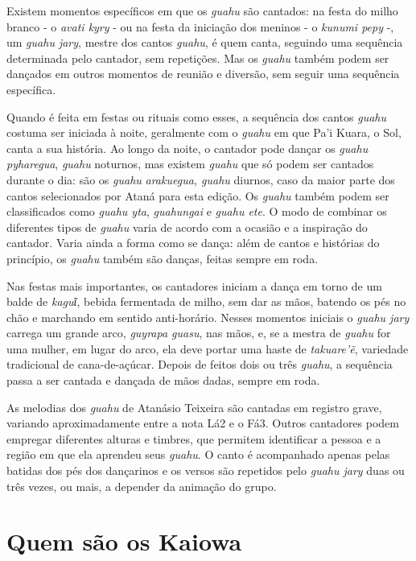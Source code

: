 Existem momentos específicos em que os \emph{guahu} são cantados: na
festa do milho branco - o \emph{avati kyry} - ou na festa da iniciação
dos meninos - o \emph{kunumi pepy} -, um \emph{guahu jary}, mestre dos
cantos \emph{guahu}, é quem canta, seguindo uma sequência determinada
pelo cantador, sem repetições. Mas os \emph{guahu} também podem ser
dançados em outros momentos de reunião e diversão, sem seguir uma
sequência específica.

Quando é feita em festas ou rituais como esses, a sequência dos cantos
\emph{guahu} costuma ser iniciada à noite, geralmente com o \emph{guahu}
em que Pa'i Kuara, o Sol, canta a sua história. Ao longo da noite, o
cantador pode dançar os \emph{guahu pyharegua}, \emph{guahu} noturnos,
mas existem \emph{guahu} que só podem ser cantados durante o dia: são os
\emph{guahu} \emph{arakuegua, guahu} diurnos, caso da maior parte dos
cantos selecionados por Ataná para esta edição. Os \emph{guahu} também
podem ser classificados como \emph{guahu yta}, \emph{guahungai} e
\emph{guahu ete}. O modo de combinar os diferentes tipos de \emph{guahu}
varia de acordo com a ocasião e a inspiração do cantador. Varia ainda a
forma como se dança: além de cantos e histórias do princípio, os
\emph{guahu} também são danças, feitas sempre em roda.

Nas festas mais importantes, os cantadores iniciam a dança em torno de
um balde de \emph{kaguῖ}, bebida fermentada de milho, sem dar as mãos,
batendo os pés no chão e marchando em sentido anti-horário. Nesses
momentos iniciais o \emph{guahu jary} carrega um grande arco,
\emph{guyrapa guasu}, nas mãos, e, se a mestra de \emph{guahu} for uma
mulher, em lugar do arco, ela deve portar uma haste de \emph{takuare'ẽ},
variedade tradicional de cana-de-açúcar. Depois de feitos dois ou três
\emph{guahu}, a sequência passa a ser cantada e dançada de mãos dadas,
sempre em roda.

As melodias dos \emph{guahu} de Atanásio Teixeira são cantadas em
registro grave, variando aproximadamente entre a nota Lá2 e o Fá3.
Outros cantadores podem empregar diferentes alturas e timbres, que
permitem identificar a pessoa e a região em que ela aprendeu seus
\emph{guahu}. O canto é acompanhado apenas pelas batidas dos pés dos
dançarinos e os versos são repetidos pelo \emph{guahu jary} duas ou três
vezes, ou mais, a depender da animação do grupo.

\chapter{Quem são os Kaiowa}

